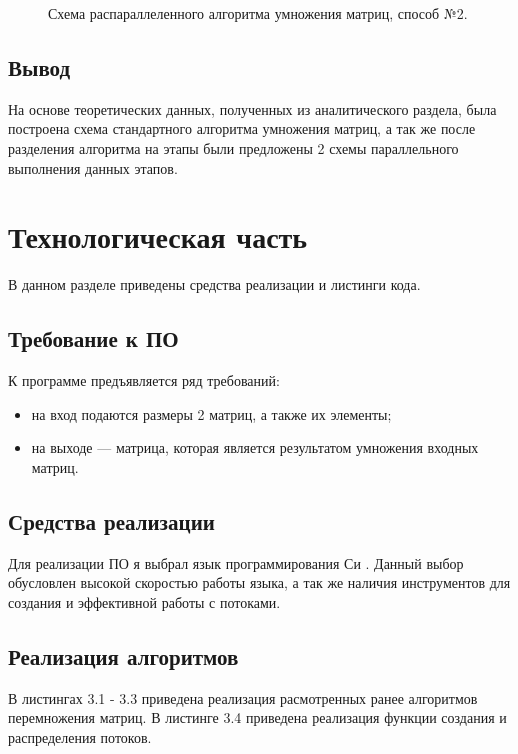 \documentclass[12pt]{report}
\begin{document}
\begin{figure}[h]
	\centering
	\caption{Схема распараллеленного алгоритма умножения матриц, способ №2.}
	\label{fig:mpr}
\end{figure}


\section{Вывод}
На основе теоретических данных, полученных из аналитического раздела, была построена схема стандартного алгоритма умножения матриц, а так же после разделения алгоритма на этапы были предложены 2 схемы параллельного выполнения данных этапов.

\chapter{Технологическая часть}

В данном разделе приведены средства реализации и листинги кода.

\section{Требование к ПО}

К программе предъявляется ряд требований:

\begin{itemize}
	\item на вход подаются размеры 2 матриц, а также их элементы;

	\item на выходе — матрица, которая является результатом умножения входных матриц.
\end{itemize}

\section{Средства реализации}
Для реализации ПО я выбрал язык программирования Си \cite{C}. Данный выбор обусловлен высокой скоростью работы языка, а так же наличия инструментов для создания и эффективной работы с потоками.

\section{Реализация алгоритмов}

В листингах 3.1 - 3.3 приведена реализация расмотренных ранее алгоритмов перемножения матриц.
В листинге 3.4 приведена реализация функции создания и распределения потоков.
\end{document}
